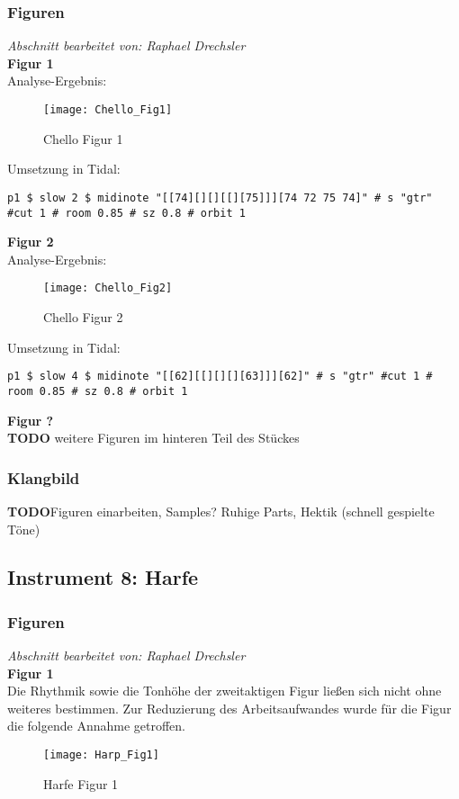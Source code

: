 \documentclass[
10pt, %
a4paper, %
oneside, %
headinclude,footinclude, %
BCOR5mm, %
]{scrartcl}
\begin{document}
\subsubsection{Figuren}
\textit{Abschnitt bearbeitet von: Raphael Drechsler}\\

\noindent\textbf{Figur 1}\\
Analyse-Ergebnis:
\begin{figure}[h]
	\centering 
	\texttt{[image: Chello\_Fig1]} 
	\caption{Chello Figur 1}
\end{figure}

\noindent Umsetzung in Tidal:
\begin{lstlisting}
p1 $ slow 2 $ midinote "[[74][][][[][75]]][74 72 75 74]" # s "gtr" #cut 1 # room 0.85 # sz 0.8 # orbit 1
\end{lstlisting}

\noindent\textbf{Figur 2}\\
Analyse-Ergebnis:
\begin{figure}[h]
	\centering 
	\texttt{[image: Chello\_Fig2]} 
	\caption{Chello Figur 2}
\end{figure}

\noindent Umsetzung in Tidal:
\begin{lstlisting}
p1 $ slow 4 $ midinote "[[62][[][][][63]]][62]" # s "gtr" #cut 1 # room 0.85 # sz 0.8 # orbit 1
\end{lstlisting}

\noindent\textbf{Figur ?}\\
{\color{red}\textbf{TODO}} weitere Figuren im hinteren Teil des Stückes

\subsubsection{Klangbild}
{\color{red}\textbf{TODO}}Figuren einarbeiten, Samples?
Ruhige Parts, Hektik (schnell gespielte Töne)


\subsection{Instrument 8: Harfe}
\subsubsection{Figuren}
\textit{Abschnitt bearbeitet von: Raphael Drechsler}\\

\noindent\textbf{Figur 1}\\
Die Rhythmik sowie die Tonhöhe der zweitaktigen Figur ließen sich nicht ohne weiteres bestimmen. Zur Reduzierung des Arbeitsaufwandes wurde für die Figur die folgende Annahme getroffen. 
\begin{figure}[h]
	\centering 
	\texttt{[image: Harp\_Fig1]} 
	\caption{Harfe Figur 1}
\end{figure}
\end{document}
